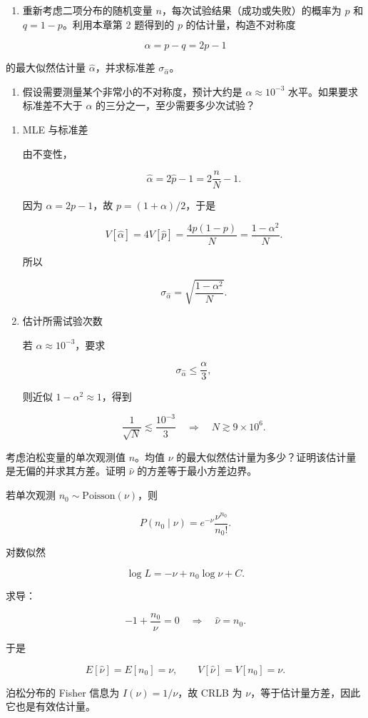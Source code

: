 \begin{question}
\begin{enumerate}
\item
  重新考虑二项分布的随机变量 \(n\)，每次试验结果（成功或失败）的概率为
  \(p\) 和 \(q=1-p\)。利用本章第 2 题得到的 \(p\) 的估计量，构造不对称度
\end{enumerate}

\[
\alpha=p-q=2p-1
\]

的最大似然估计量 \(\hat\alpha\)，并求标准差 \(\sigma_{\hat\alpha}\)。

\begin{enumerate}[start=2]
\item
  假设需要测量某个非常小的不对称度，预计大约是 \(\alpha\approx10^{-3}\)
  水平。如果要求标准差不大于 \(\alpha\) 的三分之一，至少需要多少次试验？
\end{enumerate}
\begin{solution}
\begin{enumerate}
\item MLE 与标准差

由不变性，

\[
\hat\alpha=2\hat p-1=2\frac nN-1.
\]

因为 \(\alpha=2p-1\)，故 \(p=(1+\alpha)/2\)，于是

\[
V[\hat\alpha]=4V[\hat p]=\frac{4p(1-p)}{N}=\frac{1-\alpha^2}{N}.
\]

所以

\[
\sigma_{\hat\alpha}=\sqrt{\frac{1-\alpha^2}{N}}.
\]

\item 估计所需试验次数

若 \(\alpha\approx10^{-3}\)，要求

\[
\sigma_{\hat\alpha}\le \frac\alpha3,
\]

则近似 \(1-\alpha^2\approx1\)，得到

\[
\frac1{\sqrt N}\lesssim\frac{10^{-3}}3
\quad\Rightarrow\quad
N\gtrsim9\times10^6.
\]
\end{enumerate}
\end{solution}
\end{question}


\begin{question}
考虑泊松变量的单次观测值 \(n\)。均值 \(\nu\)
的最大似然估计量为多少？证明该估计量是无偏的并求其方差。证明 \(\hat\nu\)
的方差等于最小方差边界。
\begin{solution}
若单次观测 \(n_0\sim\mathrm{Poisson}(\nu)\)，则

\[
P(n_0\mid\nu)=e^{-\nu}\frac{\nu^{n_0}}{n_0!}.
\]

对数似然

\[
\log L=-\nu+n_0\log\nu+C.
\]

求导：

\[
-1+\frac{n_0}{\nu}=0
\quad\Rightarrow\quad
\hat\nu=n_0.
\]

于是

\[
E[\hat\nu]=E[n_0]=\nu,
\qquad
V[\hat\nu]=V[n_0]=\nu.
\]

泊松分布的 Fisher 信息为 \(I(\nu)=1/\nu\)，故 CRLB 为
\(\nu\)，等于估计量方差，因此它也是有效估计量。
\end{solution}
\end{question}


